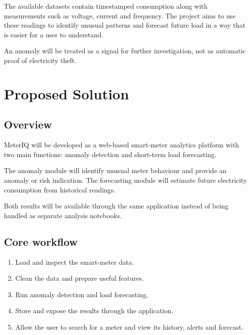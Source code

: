 \documentclass[11pt,a4paper]{article}
\begin{document}
The available datasets contain timestamped consumption along with
measurements such as voltage, current and frequency. The project
aims to use these readings to identify unusual patterns and forecast
future load in a way that is easier for a user to understand.

An anomaly will be treated as a signal for further investigation,
not as automatic proof of electricity theft.

\section{Proposed Solution}

\subsection{Overview}

MeterIQ will be developed as a web-based smart-meter analytics
platform with two main functions: anomaly detection and short-term
load forecasting.

The anomaly module will identify unusual meter behaviour and provide
an anomaly or risk indication. The forecasting module will estimate
future electricity consumption from historical readings.

Both results will be available through the same application instead
of being handled as separate analysis notebooks.

\subsection{Core workflow}

\begin{enumerate}[leftmargin=0.7cm]

    \item Load and inspect the smart-meter data.

    \item Clean the data and prepare useful features.

    \item Run anomaly detection and load forecasting.

    \item Store and expose the results through the application.

    \item Allow the user to search for a meter and view its history,
    alerts and forecast.

\end{enumerate}
\end{document}
